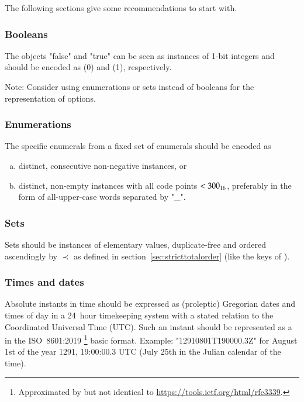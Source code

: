 The following sections give some recommendations to start with.


\subsubsection{Booleans}

The objects "false" and "true" can be seen as instances of 1-bit integers and should be encoded as
\DborIntegerValue(0) and \DborIntegerValue(1), respectively.

Note: Consider using enumerations or sets instead of booleans for the representation of options.


\subsubsection{Enumerations}

The specific enumerals from a fixed set of enumerals should be encoded as
\begin{enumerate}[a)]
    \item
    distinct, consecutive non-negative \DborIntegerValue{} instances, or

    \item
    distinct, non-empty \DborUtfEightStringValue{} instances with all code points $< \mathrm{300}_{16}$,
    preferably in the form of all-upper-case words separated by "\_".
\end{enumerate}


\subsubsection{Sets}

Sets should be \DborSequenceValue{} instances of elementary values,
duplicate-free and ordered ascendingly by ${\prec}$ as defined in section~\ref{sec:stricttotalorder}
(like the keys of \DborDictionaryValue).


\subsubsection{Times and dates}

Absolute instants in time should be expressed as (proleptic) Gregorian dates and times of day in a
24~hour timekeeping system with a stated relation to the Coordinated Universal Time (UTC).
Such an instant should be represented as a \DborUtfEightStringValue{} in the ISO~8601:2019 %
\footnote{%
    Approximated by but not identical to \href{RFC~2229}{https://tools.ietf.org/html/rfc3339}.
} basic format.
Example: "12910801T190000.3Z" for August 1st of the year 1291, 19:00:00.3 UTC
(July 25th in the Julian calendar of the time).

